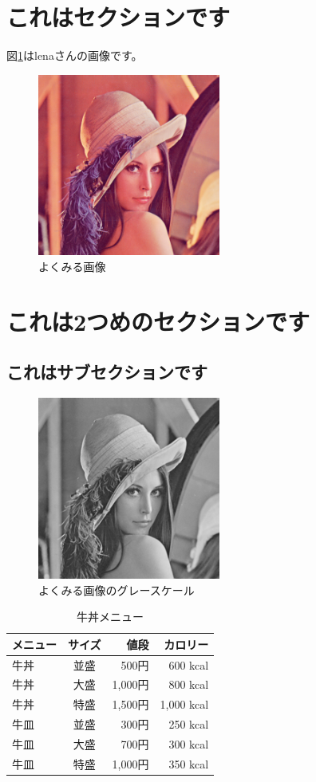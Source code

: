 \documentclass[10pt,a4paper,twocolumn]{ltjsarticle}
\begin{document}
\tableofcontents

\section{これはセクションです}
図\ref{lena_rgb}はlenaさんの画像です。
\begin{figure}[H]
  \centering
  \includegraphics[width=6cm]{./lena.png}
  \caption{よくみる画像}
  \label{lena_rgb}
\end{figure}

\section{これは2つめのセクションです}
\subsection{これはサブセクションです}
\begin{figure}[H]
  \centering
  \includegraphics[width=6cm]{./lena_gray.png}
  \caption{よくみる画像のグレースケール}
  \label{lena_gray}
\end{figure}

\begin{table}[H]
  \centering
  \caption{牛丼メニュー}
  \label{table}
  \begin{tabular}{|l|c|r||r|} \hline
    メニュー & サイズ & 値段 & カロリー \\ \hline \hline
    牛丼 & 並盛 & 500円 & 600 kcal \\
    牛丼 & 大盛 & 1,000円 & 800 kcal \\
    牛丼 & 特盛 & 1,500円 & 1,000 kcal \\ \hline
    牛皿 & 並盛 & 300円 & 250 kcal \\
    牛皿 & 大盛 & 700円 & 300 kcal \\
    牛皿 & 特盛 & 1,000円 & 350 kcal \\ \hline
  \end{tabular}
\end{table}
\end{document}
